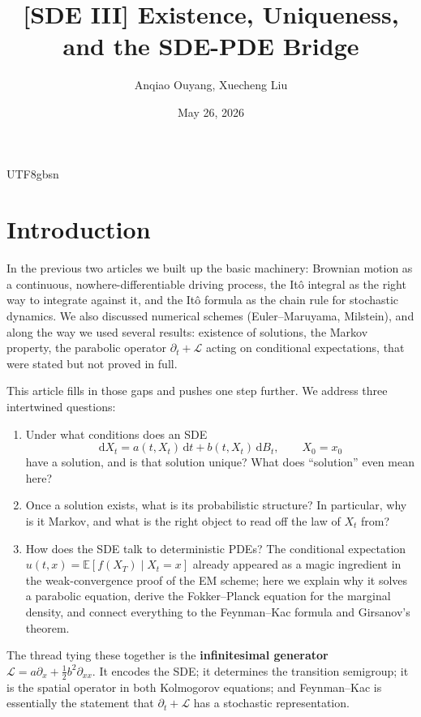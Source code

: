 \documentclass{article}
\title{[SDE III] Existence, Uniqueness, and the SDE-PDE Bridge}
\author{Anqiao Ouyang, Xuecheng Liu}
\date{May 26, 2026}
\begin{document}
\begin{CJK*}{UTF8}{gbsn}

\maketitle

\section{Introduction}

In the previous two articles we built up the basic machinery: Brownian motion as a continuous, nowhere-differentiable driving process, the It\^o integral as the right way to integrate against it, and the It\^o formula as the chain rule for stochastic dynamics. We also discussed numerical schemes (Euler--Maruyama, Milstein), and along the way we used several results: existence of solutions, the Markov property, the parabolic operator $\partial_t+\mathcal L$ acting on conditional expectations, that were stated but not proved in full.

This article fills in those gaps and pushes one step further. We address three intertwined questions:
\begin{enumerate}
    \item Under what conditions does an SDE
    \[
      \mathrm{d}X_t=a(t,X_t)\,\mathrm{d}t+b(t,X_t)\,\mathrm{d}B_t,\qquad X_0=x_0
    \]
    have a solution, and is that solution unique? What does ``solution'' even mean here?
    \item Once a solution exists, what is its probabilistic structure? In particular, why is it Markov, and what is the right object to read off the law of $X_t$ from?
    \item How does the SDE talk to deterministic PDEs? The conditional expectation $u(t,x)=\mathbb{E}[f(X_T)\mid X_t=x]$ already appeared as a magic ingredient in the weak-convergence proof of the EM scheme; here we explain why it solves a parabolic equation, derive the Fokker--Planck equation for the marginal density, and connect everything to the Feynman--Kac formula and Girsanov's theorem.
\end{enumerate}

The thread tying these together is the \textbf{infinitesimal generator} $\mathcal L=a\partial_x+\tfrac12 b^2\partial_{xx}$. It encodes the SDE; it determines the transition semigroup; it is the spatial operator in both Kolmogorov equations; and Feynman--Kac is essentially the statement that $\partial_t+\mathcal L$ has a stochastic representation.


\end{CJK*}
\end{document}
